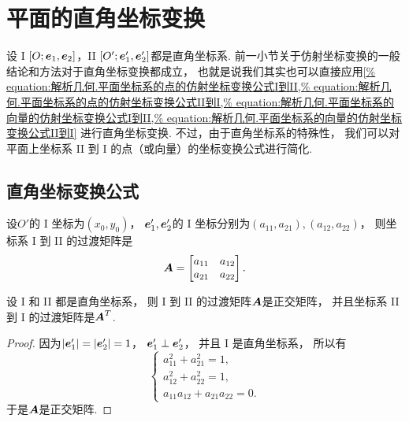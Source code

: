 \section{平面的直角坐标变换}
设 I \([O;\boldsymbol{e}_1,\boldsymbol{e}_2]\)，II \([O';\boldsymbol{e}_1',\boldsymbol{e}_2']\)都是直角坐标系.
前一小节关于仿射坐标变换的一般结论和方法对于直角坐标变换都成立，
也就是说我们其实也可以直接应用\cref{%
equation:解析几何.平面坐标系的点的仿射坐标变换公式I到II,%
equation:解析几何.平面坐标系的点的仿射坐标变换公式II到I,%
equation:解析几何.平面坐标系的向量的仿射坐标变换公式I到II,%
equation:解析几何.平面坐标系的向量的仿射坐标变换公式II到I}
进行直角坐标变换.
不过，由于直角坐标系的特殊性，
我们可以对平面上坐标系 II 到 I 的点（或向量）的坐标变换公式进行简化.

\subsection{直角坐标变换公式}
设\(O'\)的 I 坐标为\((x_0,y_0)\)，
\(\boldsymbol{e}_1',\boldsymbol{e}_2'\)的 I 坐标分别为\((a_{11},a_{21}),(a_{12},a_{22})\)，
则坐标系 I 到 II 的过渡矩阵是\begin{equation*}
	\boldsymbol{A} = \begin{bmatrix}
		a_{11} & a_{12} \\
		a_{21} & a_{22}
	\end{bmatrix}.
\end{equation*}

\begin{theorem}\label{theorem:解析几何.直角坐标变换的过渡矩阵是正交矩阵}
设 I 和 II 都是直角坐标系，
则 I 到 II 的过渡矩阵\(\boldsymbol{A}\)是正交矩阵，
并且坐标系 II 到 I 的过渡矩阵是\(\boldsymbol{A}^T\).
\begin{proof}
因为\(\abs{\boldsymbol{e}_1'}=\abs{\boldsymbol{e}_2'}=1\)，
\(\boldsymbol{e}_1' \perp \boldsymbol{e}_2'\)，
并且 I 是直角坐标系，
所以有\begin{equation}\label{equation:解析几何.直角坐标变换的过渡矩阵的限定条件}
	\left\{ \begin{array}{l}
		a_{11}^2 + a_{21}^2 = 1, \\
		a_{12}^2 + a_{22}^2 = 1, \\
		a_{11} a_{12} + a_{21} a_{22} = 0.
	\end{array} \right.
\end{equation}
于是\(\boldsymbol{A}\)是正交矩阵.
\end{proof}
\end{theorem}


